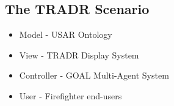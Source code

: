 \subsection{The TRADR Scenario}
\begin{itemize}
\item Model - USAR Ontology
\item View - TRADR Display System
\item Controller - GOAL Multi-Agent System
\item User - Firefighter end-users
\end{itemize}
  
  